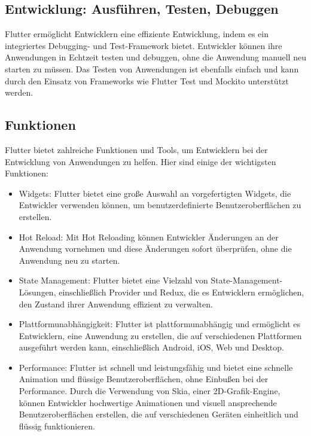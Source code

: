 \subsection{Entwicklung: Ausführen, Testen, Debuggen}

Flutter ermöglicht Entwicklern eine effiziente Entwicklung, indem es ein integriertes Debugging- und Test-Framework bietet. Entwickler können ihre Anwendungen in Echtzeit testen und debuggen, ohne die Anwendung manuell neu starten zu müssen. Das Testen von Anwendungen ist ebenfalls einfach und kann durch den Einsatz von Frameworks wie Flutter Test und Mockito unterstützt werden.

\subsection{Funktionen}

Flutter bietet zahlreiche Funktionen und Tools, um Entwicklern bei der Entwicklung von Anwendungen zu helfen. Hier sind einige der wichtigsten Funktionen:

\begin{itemize}
\item Widgets: Flutter bietet eine große Auswahl an vorgefertigten Widgets, die Entwickler verwenden können, um benutzerdefinierte Benutzeroberflächen zu erstellen.
\item Hot Reload: Mit Hot Reloading können Entwickler Änderungen an der Anwendung vornehmen und diese Änderungen sofort überprüfen, ohne die Anwendung neu zu starten.
\item State Management: Flutter bietet eine Vielzahl von State-Management-Lösungen, einschließlich Provider und Redux, die es Entwicklern ermöglichen, den Zustand ihrer Anwendung effizient zu verwalten.
\item Plattformunabhängigkeit: Flutter ist plattformunabhängig und ermöglicht es Entwicklern, eine Anwendung zu erstellen, die auf verschiedenen Plattformen ausgeführt werden kann, einschließlich Android, iOS, Web und Desktop.
\newpage
\item Performance: Flutter ist schnell und leistungsfähig und bietet eine schnelle Animation und flüssige Benutzeroberflächen, ohne Einbußen bei der Performance. Durch die Verwendung von Skia, einer 2D-Grafik-Engine, können Entwickler hochwertige Animationen und visuell ansprechende Benutzeroberflächen erstellen, die auf verschiedenen Geräten einheitlich und flüssig funktionieren.
\end{itemize}

